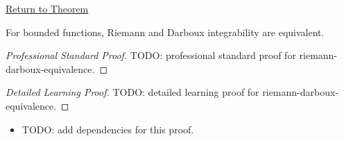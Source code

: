 \newpage
{}
\label{prf:riemann-darboux-equivalence}
\begin{remark*}[Return]\hyperref[thm:riemann-darboux-equivalence]{Return to Theorem}\end{remark*}

\begin{theorem*}
For bounded functions, Riemann and Darboux integrability are equivalent.
\end{theorem*}

\begin{proof}[Professional Standard Proof]
\LRAProofBodyStart
TODO: professional standard proof for riemann-darboux-equivalence.
\end{proof}

\begin{proof}[Detailed Learning Proof]
\LRAProofBodyStart
TODO: detailed learning proof for riemann-darboux-equivalence.
\end{proof}

\begin{remark*}
\end{remark*}

\begin{dependencies}
\begin{itemize}
  \item TODO: add dependencies for this proof.
\end{itemize}
\end{dependencies}

\clearpage
